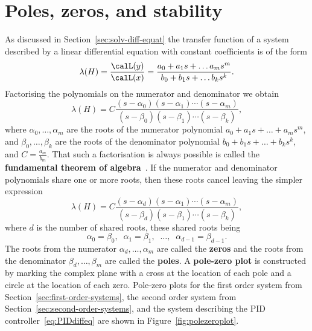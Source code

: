 \documentclass[11pt,a4paper]{book}
\theoremstyle{plain}
\numberwithin{equation}{section}
\newcommand{\term}{\textbf}
\begin{document}
\section{Poles, zeros, and stability}\label{sec:poles-zeros-stab}

As discussed in Section~\ref{sec:solv-diff-equat} the transfer function of a system described by a linear differential equation with constant coefficients is of the form
\[
\lambda(H) = \frac{\calL(y)}{\calL(x)} = \frac{a_0 + a_1s + \dots a_m s^m}{b_0 + b_1s + \dots b_k s^k}.
\]
Factorising the polynomials on the numerator and denominator we obtain
\[
\lambda(H) = C\frac{(s-\alpha_0)(s - \alpha_1)\cdots(s - \alpha_m)}{(s-\beta_0)(s - \beta_1)\cdots(s - \beta_k)},
\] 
where $\alpha_0, \dots, \alpha_m$ are the roots of the numerator polynomial $a_0 + a_1s + \dots + a_m s^m$, and $\beta_0, \dots, \beta_k$ are the roots of the denominator polynomial $b_0 + b_1s + \dots + b_k s^k$, and $C = \tfrac{a_m}{b_m}$.  That such a factorisation is always possible is called the \term{fundamental theorem of algebra}~\citep{Fine_fundamental_theorem_of_algebra}.  %
If the numerator and denominator polynomials share one or more roots, then these roots cancel leaving the simpler expression
\begin{equation}\label{eq:transfuncpoleszeros}
\lambda(H) = C\frac{(s-\alpha_d)(s - \alpha_1)\cdots(s - \alpha_{m})}{(s-\beta_d)(s - \beta_1)\cdots(s - \beta_{k})},
\end{equation}
where $d$ is the number of shared roots, these shared roots being 
\[
\alpha_0 = \beta_0, \;\; \alpha_1 = \beta_1, \;\; \dots, \;\;  \alpha_{d-1} = \beta_{d-1}.
\]
The roots from the numerator $\alpha_d, \dots, \alpha_m$ are called the \term{zeros} and the roots from the denominator $\beta_d, \dots, \beta_m$ are called the \term{poles}.  A \term{pole-zero plot} is constructed by marking the complex plane with a cross at the location of each pole and a circle at the location of each zero.  Pole-zero plots for the first order system from Section~\ref{sec:first-order-systems}, the second order system from Section~\ref{sec:second-order-systems}, and the system describing the PID controller~\eqref{eq:PIDdiffeq} are shown in Figure~\ref{fig:polezeroplot}.
\end{document}
